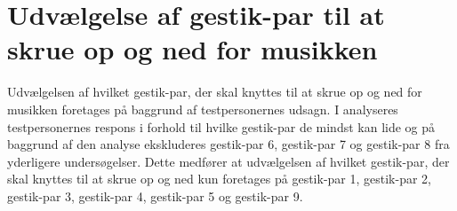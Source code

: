 \section{Udvælgelse af gestik-par til at skrue op og ned for musikken}
\label{TestresultaterVolumen}
%
Udvælgelsen af hvilket gestik-par, der skal knyttes til at skrue op og ned for musikken foretages på baggrund af testpersonernes udsagn. I  analyseres testpersonernes respons i forhold til hvilke gestik-par de mindst kan lide og på baggrund af den analyse ekskluderes gestik-par 6, gestik-par 7 og gestik-par 8 fra yderligere undersøgelser. Dette medfører at udvælgelsen af hvilket gestik-par, der skal knyttes til at skrue op og ned kun foretages på gestik-par 1, gestik-par 2, gestik-par 3, gestik-par 4, gestik-par 5 og gestik-par 9.\blankline
%   
